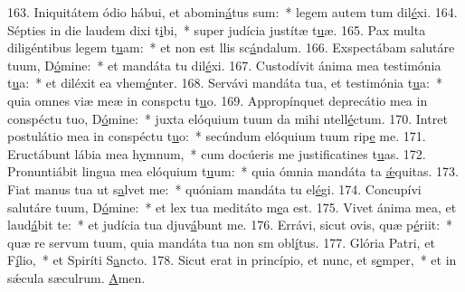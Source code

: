 163. Iniquitátem ódio hábui, et abomin\uline{á}tus sum:~* legem autem tum dil\uline{é}xi.
164. Sépties in die laudem dixi t\uline{i}bi,~* super judícia justítæ t\uline{u}æ.
165. Pax multa diligéntibus legem t\uline{u}am:~* et non est llis sc\uline{á}ndalum.
166. Exspectábam salutáre tuum, D\uline{ó}mine:~* et mandáta tu dil\uline{é}xi.
167. Custodívit ánima mea testimónia t\uline{u}a:~* et diléxit ea vhem\uline{é}nter.
168. Servávi mandáta tua, et testimónia t\uline{u}a:~* quia omnes viæ meæ in conspctu t\uline{u}o.
169. Appropínquet deprecátio mea in conspéctu tuo, D\uline{ó}mine:~* juxta elóquium tuum da mihi ntell\uline{é}ctum.
170. Intret postulátio mea in conspéctu t\uline{u}o:~* secúndum elóquium tuum rip\uline{e} me.
171. Eructábunt lábia mea h\uline{y}mnum,~* cum docúeris me justificatines t\uline{u}as.
172. Pronuntiábit lingua mea elóquium t\uline{u}um:~* quia ómnia mandáta ta \uline{ǽ}quitas.
173. Fiat manus tua ut s\uline{a}lvet me:~* quóniam mandáta tu el\uline{é}gi.
174. Concupívi salutáre tuum, D\uline{ó}mine:~* et lex tua meditáto m\uline{e}a est.
175. Vivet ánima mea, et laud\uline{á}bit te:~* et judícia tua djuv\uline{á}bunt me.
176. Errávi, sicut ovis, quæ p\uline{é}riit:~* quæ re servum tuum, quia mandáta tua non sm obl\uline{í}tus.
177. Glória Patri, et F\uline{í}lio,~* et Spiríti S\uline{a}ncto.
178. Sicut erat in princípio, et nunc, et s\uline{e}mper,~* et in sǽcula sæculrum. \uline{A}men.
